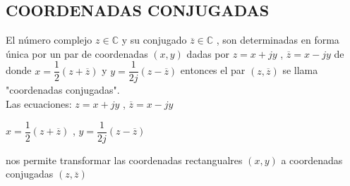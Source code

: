 \documentclass[10pt,a4paper]{book}
\begin{document}
\subsection{COORDENADAS CONJUGADAS}
El número complejo $z \in \mathbb{C}$ y su conjugado $\overline{z} \in \mathbb{C}$ , son determinadas en forma única por un par de coordenadas $(x,y)$ dadas por $z = x +jy$ , $\overline{z} = x -jy$ de donde $x = \dfrac{1}{2}(z+\overline{z})$ y $y = \dfrac{1}{2j}(z-\overline{z})$ entonces el par $(z,\overline{z})$ se llama "coordenadas conjugadas". \\
Las ecuaciones: $\displaystyle z = x +jy$ , $\displaystyle \overline{z} = x -jy$\\
\begin{center}
 $\displaystyle x =\dfrac{1}{2}(z+\overline{z})$ , $\displaystyle y = \dfrac{1}{2j}(z-\overline{z})$
\end{center}
nos permite transformar las coordenadas rectangualres $(x,y)$ a coordenadas conjugadas $\displaystyle (z,\overline{z})$   \\
\end{document}
